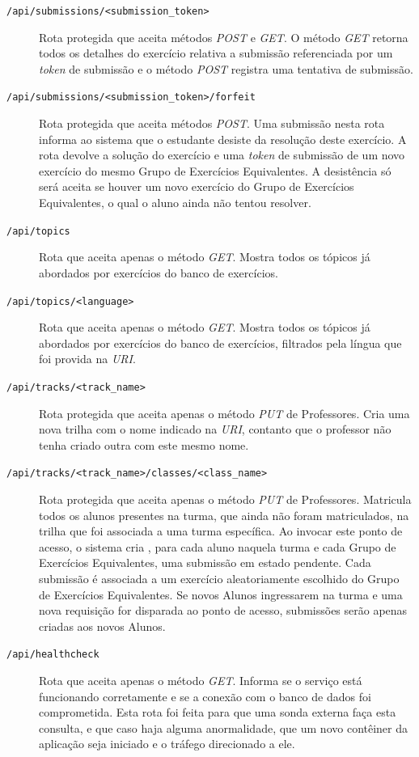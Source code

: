 \begin{description}
\item[\texttt{/api/submissions/<submission\_token>}] Rota protegida que aceita  métodos \emph{POST} e \emph{GET}. O método \emph{GET} retorna todos os detalhes do exercício relativa a submissão referenciada 
por um \emph{token} de submissão e o método \emph{POST} registra uma tentativa de submissão.
\item[\texttt{/api/submissions/<submission\_token>/forfeit}] Rota protegida que aceita  métodos \emph{POST}.
Uma submissão nesta rota informa ao sistema que o estudante desiste da resolução deste exercício. A rota 
devolve a solução do exercício e uma \emph{token} de submissão de um novo exercício do mesmo Grupo de Exercícios Equivalentes. A desistência só será aceita se houver um novo exercício do Grupo de Exercícios Equivalentes, o qual o aluno ainda não tentou resolver.
\item[\texttt{/api/topics}] Rota que aceita apenas o método \emph{GET}. Mostra todos os tópicos já abordados por exercícios do banco de exercícios.
\item[\texttt{/api/topics/<language>}] Rota que aceita apenas o método \emph{GET}. Mostra todos os tópicos já abordados por exercícios do banco de exercícios, filtrados pela língua que foi 
provida na \emph{URI}.
\item[\texttt{/api/tracks/<track\_name>}] Rota protegida que aceita apenas o método \emph{PUT} de Professores. 
Cria uma nova trilha com o nome indicado na \emph{URI}, contanto que o professor não tenha criado outra com este mesmo nome.
\item[\texttt{/api/tracks/<track\_name>/classes/<class\_name>}] Rota protegida que aceita apenas o método \emph{PUT} de Professores. Matricula todos os alunos 
presentes na turma, que ainda não foram matriculados, na trilha que foi associada a uma turma específica. Ao invocar este ponto de acesso, o sistema cria 
, para cada aluno naquela turma e cada Grupo de Exercícios Equivalentes, uma submissão em estado pendente. Cada submissão é associada a um exercício aleatoriamente 
escolhido do Grupo de Exercícios Equivalentes. Se novos Alunos ingressarem na turma e uma nova requisição for disparada  ao ponto de acesso, submissões serão apenas 
criadas aos novos Alunos.
\item[\texttt{/api/healthcheck}] Rota que aceita apenas o método \emph{GET}. Informa se o serviço está funcionando corretamente e se a conexão com o banco de dados foi comprometida. Esta rota foi feita para que uma sonda externa faça esta consulta, e que caso haja alguma anormalidade, que um novo contêiner da aplicação seja iniciado e o tráfego direcionado a ele. 
\end{description}

